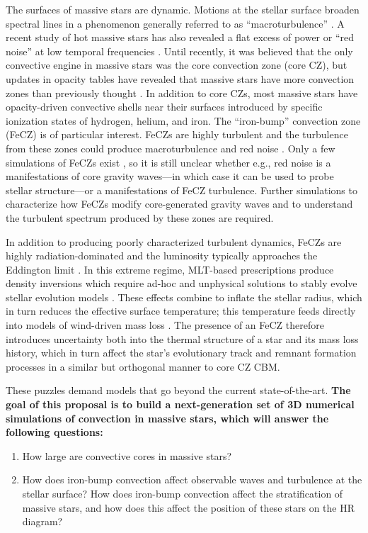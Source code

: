 \documentclass[11pt]{amsart} %
\theoremstyle{definition}
\numberwithin{equation}{section}
\begin{document}
The surfaces of massive stars are dynamic.
Motions at the stellar surface broaden spectral lines in a phenomenon generally referred to as ``macroturbulence'' \citep{schultz_etal_2022b}.
A recent study of hot massive stars has also revealed a flat excess of power or ``red noise'' at low temporal frequencies \citep[see Fig.~\ref{fig:intro}, right;][]{bowman_etal_2019}.
Until recently, it was believed that the only convective engine in massive stars was the core convection zone (core CZ), but updates in opacity tables have revealed that massive stars have more convection zones than previously thought \citep[see Fig.~\ref{fig:intro}, left;][]{cantiello_etal_2009}.
In addition to core CZs, most massive stars have opacity-driven convective shells near their surfaces introduced by specific ionization states of hydrogen, helium, and iron.
The ``iron-bump'' convection zone (FeCZ) is of particular interest.
FeCZs are highly turbulent and the turbulence from these zones could produce macroturbulence and red noise \citep{cantiello_etal_2021, schultz_etal_2022, schultz_etal_2022b}.
Only a few simulations of FeCZs exist \citep{jiang_etal_2015}, so it is still unclear whether e.g., red noise is a manifestations of core gravity waves---in which case it can be used to probe stellar structure---or a manifestations of FeCZ turbulence.
Further simulations to characterize how FeCZs modify core-generated gravity waves and to understand the turbulent spectrum produced by these zones are required.

In addition to producing poorly characterized turbulent dynamics, FeCZs are highly radiation-dominated and the luminosity typically approaches the Eddington limit \citep{jermyn_etal_2022_atlas}.
In this extreme regime, MLT-based prescriptions produce density inversions which require ad-hoc and unphysical solutions to stably evolve stellar evolution models \citep{kohler_etal_2015}.
These effects combine to inflate the stellar radius, which in turn reduces the effective surface temperature; this temperature feeds directly into models of wind-driven mass loss \citep{yusof_etal_2013}.
The presence of an FeCZ therefore introduces uncertainty both into the thermal structure of a star and its mass loss history, which in turn affect the star's evolutionary track and remnant formation processes in a similar but orthogonal manner to core CZ CBM.

These puzzles demand models that go beyond the current state-of-the-art.
\textbf{The goal of this proposal is to build a next-generation set of 3D numerical simulations of convection in massive stars, which will answer the following questions:}
\begin{enumerate}
    \item How large are convective cores in massive stars?
    \item How does iron-bump convection affect observable waves and turbulence at the stellar surface?
    How does iron-bump convection affect the stratification of massive stars, and how does this affect the position of these stars on the HR diagram? 
\end{enumerate}
\end{document}
